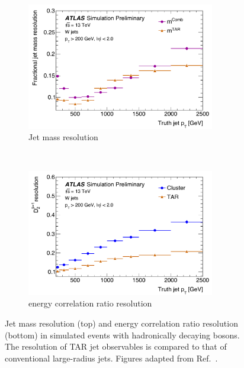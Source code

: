 \begin{figure}[hbtp]
  \centering
  \begin{subfigure}{1.\textwidth}
    \centering
  \includegraphics[width=0.9\textwidth]{figures/monoS/tar_massresolution.pdf}
    \caption{Jet mass resolution}
  \end{subfigure}
  \\
  \begin{subfigure}{1.\textwidth}
    \centering
    \includegraphics[width=0.9\textwidth]{figures/monoS/tar_d2resolution.pdf}
    \caption{\dtwo energy correlation ratio resolution}
  \end{subfigure}
  \caption{Jet mass resolution (top) and \dtwo energy correlation ratio resolution (bottom) in simulated events with hadronically decaying \PW bosons. The resolution of TAR jet observables is compared to that of conventional large-radius jets. Figures adapted from Ref.~\cite{ATL-PHYS-PUB-2018-012}.}
  \label{fig:monoSVV:selection:objects:tar-resolution}
\end{figure}

